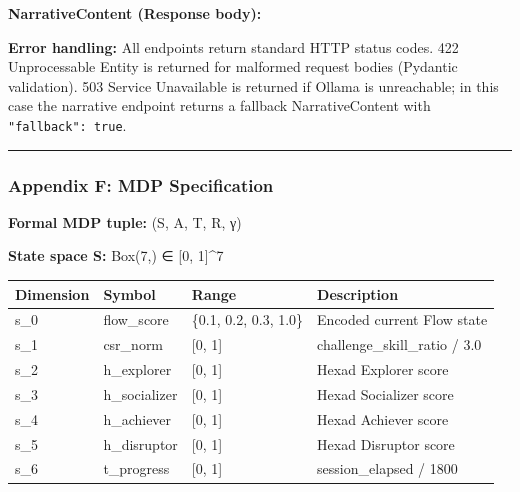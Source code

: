 \textbf{NarrativeContent (Response body):}

\begin{Shaded}
\begin{Highlighting}[]
\FunctionTok{\{}
  \FunctionTok{:} \FunctionTok{,}
  \FunctionTok{:} \FunctionTok{,}
  \FunctionTok{:} \FunctionTok{,}
  \FunctionTok{:} \FunctionTok{,}
  \FunctionTok{:} \FunctionTok{,}
  \FunctionTok{:} \OtherTok{[]}\FunctionTok{,}
  \FunctionTok{:} 
\FunctionTok{\}}
\end{Highlighting}
\end{Shaded}

\textbf{Error handling:} All endpoints return standard HTTP status
codes. 422 Unprocessable Entity is returned for malformed request bodies
(Pydantic validation). 503 Service Unavailable is returned if Ollama is
unreachable; in this case the narrative endpoint returns a fallback
NarrativeContent with \texttt{"fallback":\ true}.

\begin{center}\rule{0.5\linewidth}{0.5pt}\end{center}

\subsubsection{Appendix F: MDP
Specification}\label{appendix-f-mdp-specification}

\textbf{Formal MDP tuple:} (S, A, T, R, γ)

\textbf{State space S:} Box(7,) ∈ {[}0, 1{]}\^{}7

\begin{longtable}[]{@{}llll@{}}
\toprule\noalign{}
Dimension & Symbol & Range & Description \\
\midrule\noalign{}
\endhead
\bottomrule\noalign{}
\endlastfoot
s\_0 & flow\_score & \{0.1, 0.2, 0.3, 1.0\} & Encoded current Flow
state \\
s\_1 & csr\_norm & {[}0, 1{]} & challenge\_skill\_ratio / 3.0 \\
s\_2 & h\_explorer & {[}0, 1{]} & Hexad Explorer score \\
s\_3 & h\_socializer & {[}0, 1{]} & Hexad Socializer score \\
s\_4 & h\_achiever & {[}0, 1{]} & Hexad Achiever score \\
s\_5 & h\_disruptor & {[}0, 1{]} & Hexad Disruptor score \\
s\_6 & t\_progress & {[}0, 1{]} & session\_elapsed / 1800 \\
\end{longtable}

